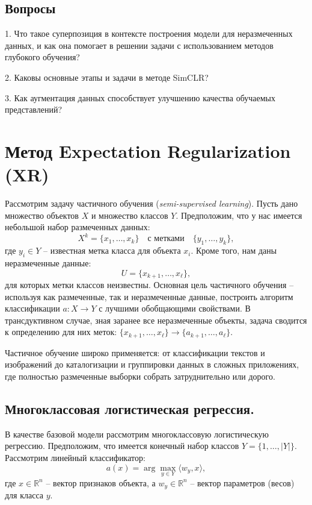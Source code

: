 \subsection{Вопросы}
\hspace{2em}1. Что такое суперпозиция в контексте построения модели для неразмеченных данных, и как она помогает в решении задачи с использованием методов глубокого обучения?

2. Каковы основные этапы и задачи в методе SimCLR?

3. Как аугментация данных способствует улучшению качества обучаемых представлений?

\section{Метод Expectation Regularization (XR)}

Рассмотрим задачу частичного обучения (\textit{semi-supervised learning}). Пусть дано множество объектов $X$ и множество классов $Y$. Предположим, что у нас имеется небольшой набор размеченных данных:
\[
X^k = \{ x_1, \ldots, x_k \} \quad \text{с метками} \quad \{y_1, \ldots, y_k\},
\]
где $y_i \in Y$ – известная метка класса для объекта $x_i$. Кроме того, нам даны неразмеченные данные:
\[
U = \{x_{k+1}, \ldots, x_{\ell}\},
\]
для которых метки классов неизвестны. Основная цель частичного обучения – используя как размеченные, так и неразмеченные данные, построить алгоритм классификации $a: X \rightarrow Y$ с лучшими обобщающими свойствами. В трансдуктивном случае, зная заранее все неразмеченные объекты, задача сводится к определению для них меток: $\{x_{k+1}, \ldots, x_{\ell}\} \rightarrow \{a_{k+1}, \ldots, a_{\ell}\}$.

Частичное обучение широко применяется: от классификации текстов и изображений до каталогизации и группировки данных в сложных приложениях, где полностью размеченные выборки собрать затруднительно или дорого.

\subsection{Многоклассовая логистическая регрессия.}

В качестве базовой модели рассмотрим многоклассовую логистическую регрессию. Предположим, что имеется конечный набор классов $Y = \{1, \ldots, |Y|\}$. Рассмотрим линейный классификатор:
\[
a(x) = \arg \max_{y \in Y} \langle w_y, x \rangle, 
\]
где $x \in \mathbb{R}^n$ – вектор признаков объекта, а $w_y \in \mathbb{R}^n$ – вектор параметров (весов) для класса $y$.

